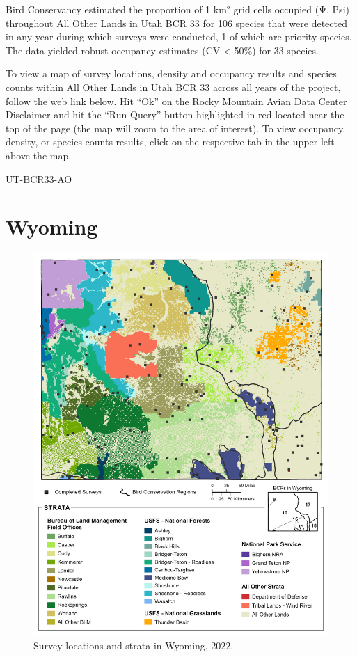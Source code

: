 \documentclass[
  letterpaper,
  DIV=11,
  numbers=noendperiod,
  oneside]{scrreprt}
\begin{document}
Bird Conservancy estimated the proportion of 1 km² grid cells occupied
(Ψ, Psi) throughout All Other Lands in Utah BCR 33 for 106 species that
were detected in any year during which surveys were conducted, 1 of
which are priority species. The data yielded robust occupancy estimates
(CV \textless{} 50\%) for 33 species.

To view a map of survey locations, density and occupancy results and
species counts within All Other Lands in Utah BCR 33 across all years of
the project, follow the web link below. Hit ``Ok'' on the Rocky Mountain
Avian Data Center Disclaimer and hit the ``Run Query'' button
highlighted in red located near the top of the page (the map will zoom
to the area of interest). To view occupancy, density, or species counts
results, click on the respective tab in the upper left above the map.

\href{http://www.rmbo.org/new_site/adc/QueryWindow.aspx\#N4IgzgLgTghhCuBbEAuABCAqgFQLQCEBhAJQGZTcBBAeXUoBt61qIALAUyjQBkYA7ACZgQAXyA==}{UT-BCR33-AO}

\hypertarget{wyoming}{%
\chapter{Wyoming}\label{wyoming}}

\begin{figure}

{\centering \includegraphics{./WY_Report_2022.png}

}

\caption{\label{fig-wy}Survey locations and strata in Wyoming, 2022.}

\end{figure}
\end{document}
